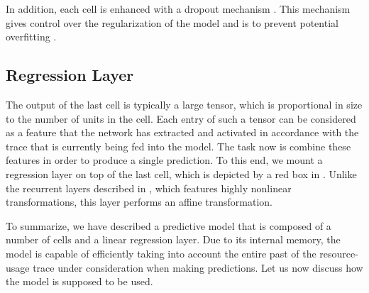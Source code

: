 In addition, each cell is enhanced with a dropout mechanism \cite{zaremba2014}.
This mechanism gives control over the regularization of the model and is to
prevent potential overfitting \cite{hastie2009}.

\subsection{Regression Layer}
The output of the last cell is typically a large tensor, which is proportional
in size to the number of units in the cell. Each entry of such a tensor can be
considered as a feature that the network has extracted and activated in
accordance with the trace that is currently being fed into the model. The task
now is combine these features in order to produce a single prediction. To this
end, we mount a regression layer on top of the last cell, which is depicted by a
red box in . Unlike the recurrent layers described in
, which features highly nonlinear transformations, this layer
performs an affine transformation.

To summarize, we have described a predictive model that is composed of a number
of  cells and a linear regression layer. Due to its internal memory,
the model is capable of efficiently taking into account the entire past of the
resource-usage trace under consideration when making predictions. Let us now
discuss how the model is supposed to be used.
